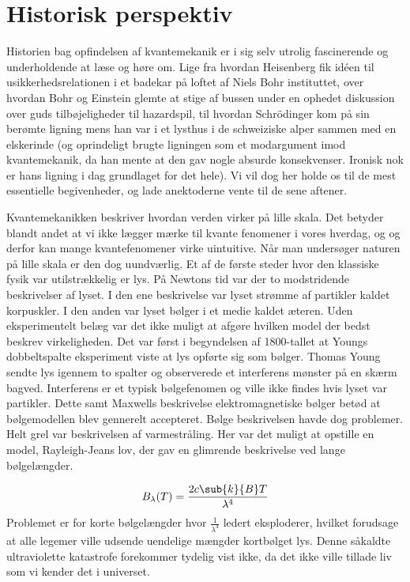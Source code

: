 \section{Historisk perspektiv}
Historien bag opfindelsen af kvantemekanik er i sig selv utrolig fascinerende og underholdende at læse og høre om. Lige fra hvordan Heisenberg fik idéen til usikkerhedsrelationen i et badekar på loftet af Niels Bohr instituttet, over hvordan Bohr og Einstein glemte at stige af bussen under en ophedet diskussion over guds tilbøjeligheder til hazardspil, til hvordan Schrödinger kom på sin berømte ligning mens han var i et lysthus i de schweiziske alper sammen med en elskerinde (og oprindeligt brugte ligningen som et modargument imod kvantemekanik, da han mente at den gav nogle absurde konsekvenser. Ironisk nok er hans ligning i dag grundlaget  for det hele). Vi vil dog her holde os til de mest essentielle begivenheder, og lade anektoderne vente til de sene aftener.


Kvantemekanikken beskriver hvordan verden virker på lille skala.
Det betyder blandt andet at vi ikke lægger mærke til kvante fenomener i vores hverdag, og og derfor kan mange kvantefenomener virke uintuitive.
Når man undersøger naturen på lille skala er den dog uundværlig.
Et af de første steder hvor den klassiske fysik var utilstrækkelig er lys.
På Newtons tid var der to modstridende beskrivelser af lyset.
I den ene beskrivelse var lyset strømme af partikler kaldet korpuskler.
I den anden var lyset bølger i et medie kaldet æteren.
Uden eksperimentelt belæg var det ikke muligt at afgøre hvilken model der bedst beskrev virkeligheden.
Det var først i begyndelsen af 1800-tallet at Youngs dobbeltspalte eksperiment viste at lys opførte sig som bølger.
Thomas Young sendte lys igennem to spalter og observerede et interferens mønster på en skærm bagved.
Interferens er et typisk bølgefenomen og ville ikke findes hvis lyset var partikler.
Dette samt Maxwells beskrivelse elektromagnetiske bølger betød at bølgemodellen blev gennerelt accepteret.
Bølge beskrivelsen havde dog problemer.
Helt grel var beskrivelsen af varmestråling.
Her var det muligt at opstille en model, Rayleigh-Jeans lov, der gav en glimrende beskrivelse ved lange bølgelængder.

$$
B_\lambda (T)= \frac{2c\sub{k}{B}T}{\lambda^4}
$$
Problemet er for korte bølgelængder hvor $\frac{1}{\lambda^4}$ ledert eksploderer, hvilket forudsage at alle legemer ville udsende uendelige mængder kortbølget lys. Denne såkaldte ultraviolette katastrofe forekommer tydelig vist ikke, da det ikke ville tillade liv som vi kender det i universet.

